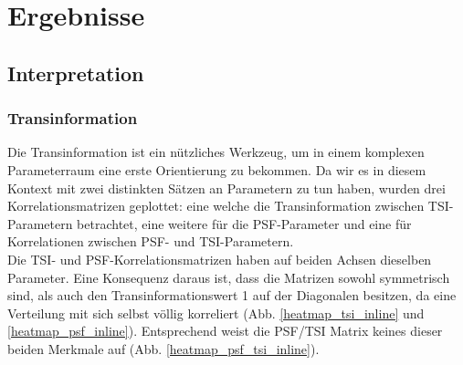 \chapter{Ergebnisse}

\section{Interpretation}
\subsection{Transinformation}
Die Transinformation ist ein nützliches Werkzeug, um in einem komplexen Parameterraum eine erste Orientierung zu bekommen. Da wir es in diesem Kontext mit zwei distinkten Sätzen an Parametern zu tun haben, wurden drei Korrelationsmatrizen geplottet: eine welche die Transinformation zwischen TSI-Parametern betrachtet, eine weitere für die PSF-Parameter und eine für Korrelationen zwischen PSF- und TSI-Parametern.\\
Die TSI- und PSF-Korrelationsmatrizen haben auf beiden Achsen dieselben Parameter. Eine Konsequenz daraus ist, dass die Matrizen sowohl symmetrisch sind, als auch den Transinformationswert 1 auf der Diagonalen besitzen, da eine Verteilung mit sich selbst völlig korreliert (Abb. \ref{heatmap_tsi_inline} und \ref{heatmap_psf_inline}). Entsprechend weist die PSF/TSI Matrix keines dieser beiden Merkmale auf (Abb. \ref{heatmap_psf_tsi_inline}).\\
\vfill\,

